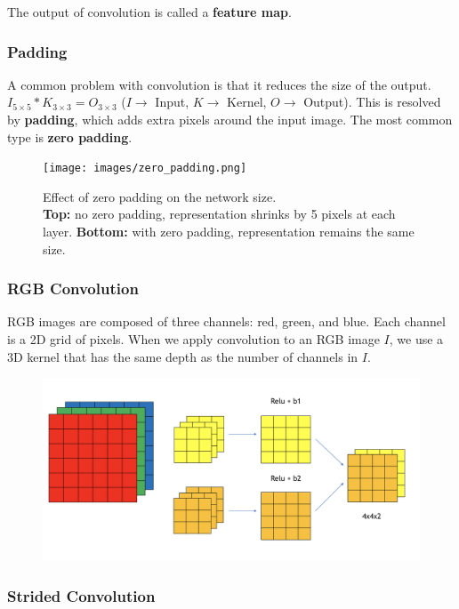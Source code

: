 The output of convolution is called a \textbf{feature map}.

\subsubsection*{Padding}

A common problem with convolution is that it reduces the size of the output. $I_{5 \times 5} * K_{3 \times 3} = O_{3 \times 3}$ ($I \rightarrow$ Input, $K \rightarrow$ Kernel, $O \rightarrow$ Output). This is resolved by \textbf{padding}, which adds extra pixels around the input image. The most common type is \textbf{zero padding}.

\begin{figure}[H]
  \centering
  \texttt{[image: images/zero\_padding.png]}
  \caption{Effect of zero padding on the network size.\\ \textbf{Top:} no zero padding, representation shrinks by 5 pixels at each layer. \textbf{Bottom:} with zero padding, representation remains the same size.}
\end{figure}

\subsubsection*{RGB Convolution}

RGB images are composed of three channels: red, green, and blue. Each channel is a 2D grid of pixels. When we apply convolution to an RGB image $I$, we use a 3D kernel that has the same depth as the number of channels in $I$.

\begin{figure}[H]
  \centering
  \includegraphics[width=\linewidth]{images/rgb_convolution.png}
\end{figure}

\subsubsection*{Strided Convolution}

